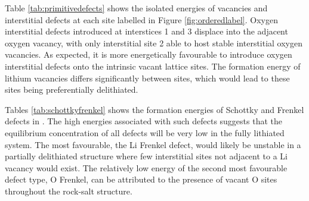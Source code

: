 \clearpage
\noindent
Table \ref{tab:primitivedefects} shows the isolated energies of vacancies and interstitial defects at each site labelled in Figure \ref{fig:orderedlabel}.
Oxygen interstitial defects introduced at interstices 1 and 3 displace into the adjacent oxygen vacancy, with only interstitial site 2 able to host stable interstitial oxygen vacancies.
As expected, it is more energetically favourable to introduce oxygen interstitial defects onto the intrinsic vacant lattice sites.
The formation energy of lithium vacancies differs significantly between sites, which would lead to these sites being preferentially delithiated.

\begin{table}[t]
\centering
\caption{Schottky and Frenkel defect energies in }
\label{tab:schottkyfrenkel}
\end{table}

\noindent
Tables \ref{tab:schottkyfrenkel} shows the formation energies of Schottky and Frenkel defects in .
The high energies associated with such defects suggests that the equilibrium concentration of all defects will be very low in the fully lithiated system.
The most favourable, the Li Frenkel defect, would likely be unstable in a partially delithiated structure where few interstitial sites not adjacent to a Li vacancy would exist.
The relatively low energy of the second most favourable defect type, O Frenkel, can be attributed to the presence of vacant O sites throughout the rock-salt structure.

